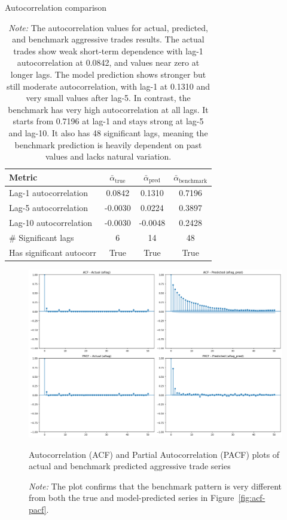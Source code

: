 \begin{table}[htbp]
\centering
\caption{Autocorrelation comparison}
\caption*{\textit{Note:} The autocorrelation values for actual, predicted, and benchmark aggressive trades results. The actual trades show weak short-term dependence with lag-1 autocorrelation at 0.0842, and values near zero at longer lags. The model prediction shows stronger but still moderate autocorrelation, with lag-1 at 0.1310 and very small values after lag-5. In contrast, the benchmark has very high autocorrelation at all lags. It starts from 0.7196 at lag-1 and stays strong at lag-5 and lag-10. It also has 48 significant lags, meaning the benchmark prediction is heavily dependent on past values and lacks natural variation.}

\begin{tabular}{lccc}
\toprule
\textbf{Metric} & $\bar{\alpha}_{\text{true}}$ & $\bar{\alpha}_{\text{pred}}$ & $\bar{\alpha}_{\text{benchmark}}$ \\
\midrule
Lag-1 autocorrelation       & 0.0842  & 0.1310  & 0.7196  \\
Lag-5 autocorrelation       & -0.0030 & 0.0224  & 0.3897  \\
Lag-10 autocorrelation      & -0.0030 & -0.0048 & 0.2428  \\
\# Significant lags         & 6       & 14      & 48      \\
Has significant autocorr    & True    & True    & True    \\
\bottomrule
\end{tabular}
\label{tab:acf-series-com}
\end{table}


\begin{figure}[H]
    \centering
    \includegraphics[width=0.95\linewidth]{figures/ACF_181330_benchmark.png}
    \caption{Autocorrelation (ACF) and Partial Autocorrelation (PACF) plots of actual and benchmark predicted aggressive trade series}
    \caption*{\textit{Note:} The plot confirms that the benchmark pattern is very different from both the true and model-predicted series in Figure~\ref{fig:acf-pacf}.}
    \label{fig:acf-pacf-com}
\end{figure}


